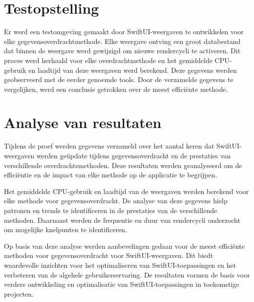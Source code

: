 \section{Testopstelling}
Er werd een testomgeving gemaakt door SwiftUI-weergaven te ontwikkelen voor elke gegevensoverdrachtmethode. Elke weergave ontving een groot databestand dat binnen de weergave werd gewijzigd om nieuwe rendercycli te activeren. Dit proces werd herhaald voor elke overdrachtmethode en het gemiddelde CPU-gebruik en laadtijd van deze weergaven werd berekend. Deze gegevens werden geobserveerd met de eerder genoemde tools. Door de verzamelde gegevens te vergelijken, werd een conclusie getrokken over de meest efficiënte methode.

\section{Analyse van resultaten}
Tijdens de proef werden gegevens verzameld over het aantal keren dat SwiftUI-weergaven werden geüpdate tijdens gegevensoverdracht en de prestaties van verschillende overdrachtsmethoden. Deze resultaten werden geanalyseerd om de efficiëntie en de impact van elke methode op de applicatie te begrijpen.

Het gemiddelde CPU-gebruik en laadtijd van de weergaven werden berekend voor elke methode voor gegevensoverdracht. De analyse van deze gegevens hielp patronen en trends te identificeren in de prestaties van de verschillende methoden. Daarnaast werden de frequentie en duur van rendercycli onderzocht om mogelijke knelpunten te identificeren.

Op basis van deze analyse werden aanbevelingen gedaan voor de meest efficiënte methoden voor gegevensoverdracht voor SwiftUI-weergaven. Dit biedt waardevolle inzichten voor het optimaliseren van SwiftUI-toepassingen en het verbeteren van de algehele gebruikerservaring. De resultaten vormen de basis voor verdere ontwikkeling en optimalisatie van SwiftUI-toepassingen in toekomstige projecten.

